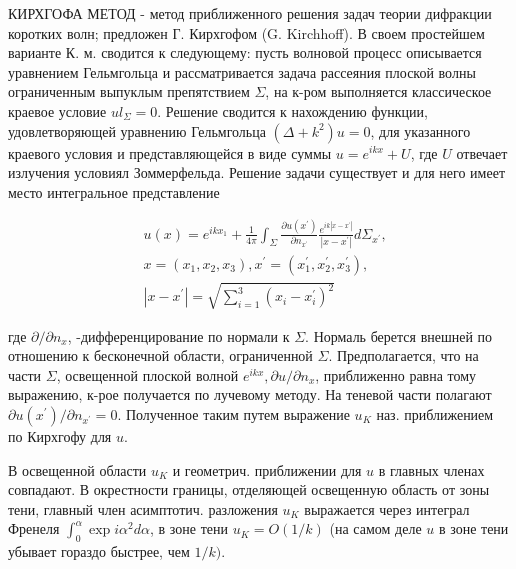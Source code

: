 \documentclass[10pt]{article}
\begin{document}
КИРХГОФА МЕТОД - метод приближенного решения задач теории дифракции коротких волн; предложен Г. Кирхгофом (G. Kirchhoff). В своем простейшем варианте К. м. сводится к следующему: пусть волновой процесс описывается уравнением Гельмгольца и рассматривается задача рассеяния плоской волны ограниченным выпуклым препятствием $\Sigma$, на к-ром выполняется классическое краевое условие $u l_{\Sigma}=0$. Решение сводится к нахождению функции, удовлетворяющей уравнению Гельмгольца $\left(\Delta+k^{2}\right) u=0$, для указанного краевого условия и представляющейся в виде суммы $u=e^{i k x}+U$, где $U$ отвечает излучения условиял Зоммерфельда. Решение задачи существует и для него имеет место интегральное представление



\[

\begin{aligned}

& u(x)=e^{i k x_{1}}+\frac{1}{4 \pi} \int_{\Sigma} \frac{\partial u\left(x^{\prime}\right)}{\partial n_{x^{\prime}}} \frac{e^{i k\left|x-x^{\prime}\right|}}{\left|x-x^{\prime}\right|} d \Sigma_{x^{\prime}}, \\

& x=\left(x_{1}, x_{2}, x_{3}\right), x^{\prime}=\left(x_{1}^{\prime}, x_{2}^{\prime}, x_{3}^{\prime}\right) \text {, } \\

& \left|x-x^{\prime}\right|=\sqrt{\sum_{i=1}^{3}\left(x_{i}-x_{i}^{\prime}\right)^{2}}

\end{aligned}

\]



где $\partial / \partial n_{x}$, -дифференцирование по нормали к $\Sigma$. Нормаль берется внешней по отношению к бесконечной области, ограниченной $\Sigma$. Предполагается, что на части $\Sigma$, освещенной плоской волной $e^{i k x}, \partial u / \partial n_{x}$, приближенно равна тому выражению, к-рое получается по лучевому методу. На теневой части полагают $\partial u\left(x^{\prime}\right) / \partial n_{x^{\prime}}=0$. Полученное таким путем выражение $u_{K}$ наз. приближением по Кирхгофу для $u$.



В освещенной области $u_{K}$ и геометрич. приближении для $u$ в главных членах совпадают. В окрестности границы, отделяющей освещенную область от зоны тени, главный член асимптотич. разложения $u_{K}$ выражается через интеграл Френеля $\int_{0}^{\alpha} \exp i \alpha^{2} d \alpha$, в зоне тени $u_{K}=O(1 / k)$ (на самом деле $u$ в зоне тени убывает гораздо быстрее, чем $1 / k)$.
\end{document}
